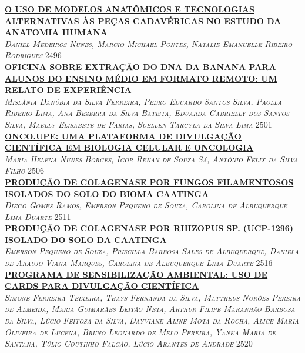 \noindent \textsc{\hyperlink{trabalhos/251708.pdf.1}{\textbf{O USO DE MODELOS ANATÔMICOS E TECNOLOGIAS ALTERNATIVAS ÀS PEÇAS CADAVÉRICAS NO ESTUDO DA ANATOMIA HUMANA}}}\\ 
\noindent \textsc{\textit{Daniel Medeiros Nunes, Marcio Michael Pontes, Natalie Emanuelle Ribeiro Rodrigues}} \hfill 2496\\ 

\noindent \textsc{\hyperlink{trabalhos/251759.pdf.1}{\textbf{OFICINA SOBRE EXTRAÇÃO DO DNA DA BANANA PARA ALUNOS DO ENSINO MÉDIO EM FORMATO REMOTO: UM RELATO DE EXPERIÊNCIA}}}\\ 
\noindent \textsc{\textit{Mislânia Danúbia da Silva Ferreira, Pedro Eduardo Santos Silva, Paolla Ribeiro Lima, Ana Bezerra da Silva Batista, Eduarda Gabrielly dos Santos Silva, Maelly Elisabete de Farias, Suellen Tarcyla da Silva Lima}} \hfill 2501\\ 

\noindent \textsc{\hyperlink{trabalhos/249835.pdf.1}{\textbf{ONCO.UPE: UMA PLATAFORMA DE DIVULGAÇÃO CIENTÍFICA EM BIOLOGIA CELULAR E ONCOLOGIA}}}\\ 
\noindent \textsc{\textit{Maria Helena Nunes Borges, Igor Renan de Souza Sá, Antônio Felix da Silva Filho}} \hfill 2506\\ 

\noindent \textsc{\hyperlink{trabalhos/249539.pdf.1}{\textbf{PRODUÇÃO DE COLAGENASE POR FUNGOS FILAMENTOSOS ISOLADOS DO SOLO DO BIOMA CAATINGA}}}\\ 
\noindent \textsc{\textit{Diego Gomes Ramos, Emerson Pequeno de Souza, Carolina de Albuquerque Lima Duarte}} \hfill 2511\\ 

\noindent \textsc{\hyperlink{trabalhos/250071.pdf.1}{\textbf{PRODUÇÃO DE COLAGENASE POR RHIZOPUS SP. (UCP-1296) ISOLADO DO SOLO DA CAATINGA}}}\\ 
\noindent \textsc{\textit{Emerson Pequeno de Souza, Priscilla Barbosa Sales de Albuquerque, Daniela de Araújo Viana Marques, Carolina de Albuquerque Lima Duarte}} \hfill 2516\\ 

\noindent \textsc{\hyperlink{trabalhos/251573.pdf.1}{\textbf{PROGRAMA DE SENSIBILIZAÇÃO AMBIENTAL: USO DE CARDS PARA DIVULGAÇÃO CIENTÍFICA}}}\\ 
\noindent \textsc{\textit{Simone Ferreira Teixeira, Thays Fernanda da Silva, Mattheus Norões Pereira de Almeida, Maria Guimarães Leitão Neta, Arthur Filipe Maranhão Barbosa da Silva, Lúcio Feitosa da Silva, Dayviane Aline Mota da Rocha, Alice Maria Oliveira de Lucena, Bruno Leonardo de Melo Pereira, Yanka Maria de Santana, Túlio Coutinho Falcão, Lúcio Arantes de Andrade}} \hfill 2520\\ 

